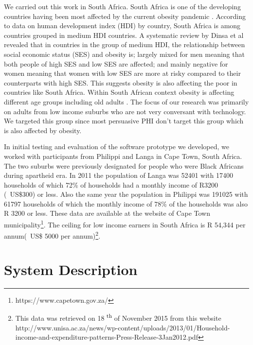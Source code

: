\documentclass{sig-alternate}
\def\SP#1{\textsuperscript{\textcolor{black}{#1}}}
\begin{document}
We carried out this work in South Africa. South Africa is one of the
developing countries having been most affected by the current obesity pandemic
\cite{ali2009factors}. According to data on human development index (HDI) by
country, South Africa is among countries grouped in medium HDI countries. A
systematic review by Dinsa et al \cite{dinsa2012obesity} revealed that in
countries in the group of medium HDI, the relationship between social economic
status (SES) and obesity is; largely mixed for men meaning that both people of
high SES and low SES are affected;  and mainly negative for women meaning that
women with low SES are more at risky compared to their counterparts with high
SES.  This suggests obesity is also affecting the poor in countries like South
Africa. Within South African context obesity is affecting different age groups
including old adults \cite{ali2009factors}. The focus of our research was
primarily on adults from low income suburbs who are not very conversant with
technology. We targeted this group since most persuasive PHI don't target this
group which is also affected by obesity.

In initial testing and evaluation of the software prototype we developed, we
worked with participants from Philippi and Langa in Cape Town, South Africa.
The two suburbs were previously designated for people who were Black Africans
during apartheid era. In 2011 the population of Langa was 52401 with 17400
households of which 72\% of households  had a monthly income of R3200
(~US\$300) or less. Also the same year the population in Philippi was 191025
with 61797 households of which the monthly income of 78\% of the households
was also R 3200 or less. These data are available at the website of Cape Town
municipality\footnote{https://www.capetown.gov.za/}.    The ceiling for low
income earners in South Africa is R 54,344 per annum(~US\$ 5000 per
annum)\footnote{This data was retrieved on 18 \SP{th} of November 2015 from
this website http://www.unisa.ac.za/news/wp-content/uploads/2013/01/Household-
income-and-expenditure-patterns-Press-Release-3Jan2012.pdf}.

\section{System Description}
\end{document}
